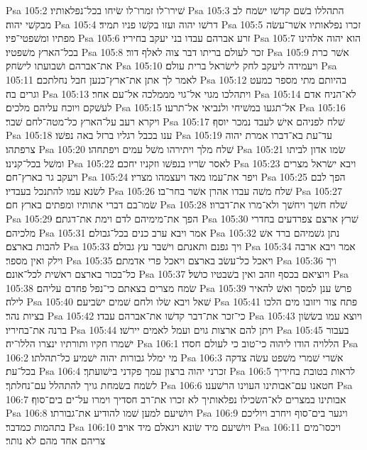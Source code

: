 Psa 105:2  שׁירו־לו זמרו־לו שׂיחו בכל־נפלאותיו׃
Psa 105:3  התהללו בשׁם קדשׁו ישׂמח לב מבקשׁי יהוה׃
Psa 105:4  דרשׁו יהוה ועזו בקשׁו פניו תמיד׃
Psa 105:5  זכרו נפלאותיו אשׁר־עשׂה מפתיו ומשׁפטי־פיו׃
Psa 105:6  זרע אברהם עבדו בני יעקב בחיריו׃
Psa 105:7  הוא יהוה אלהינו בכל־הארץ משׁפטיו׃
Psa 105:8  זכר לעולם בריתו דבר צוה לאלף דור׃
Psa 105:9  אשׁר כרת את־אברהם ושׁבועתו לישׂחק׃
Psa 105:10  ויעמידה ליעקב לחק לישׂראל ברית עולם׃
Psa 105:11  לאמר לך אתן את־ארץ־כנען חבל נחלתכם׃
Psa 105:12  בהיותם מתי מספר כמעט וגרים בה׃
Psa 105:13  ויתהלכו מגוי אל־גוי מממלכה אל־עם אחר׃
Psa 105:14  לא־הניח אדם לעשׁקם ויוכח עליהם מלכים׃
Psa 105:15  אל־תגעו במשׁיחי ולנביאי אל־תרעו׃
Psa 105:16  ויקרא רעב על־הארץ כל־מטה־לחם שׁבר׃
Psa 105:17  שׁלח לפניהם אישׁ לעבד נמכר יוסף׃
Psa 105:18  ענו בכבל רגליו ברזל באה נפשׁו׃
Psa 105:19  עד־עת בא־דברו אמרת יהוה צרפתהו׃
Psa 105:20  שׁלח מלך ויתירהו משׁל עמים ויפתחהו׃
Psa 105:21  שׂמו אדון לביתו ומשׁל בכל־קנינו׃
Psa 105:22  לאסר שׂריו בנפשׁו וזקניו יחכם׃
Psa 105:23  ויבא ישׂראל מצרים ויעקב גר בארץ־חם׃
Psa 105:24  ויפר את־עמו מאד ויעצמהו מצריו׃
Psa 105:25  הפך לבם לשׂנא עמו להתנכל בעבדיו׃
Psa 105:26  שׁלח משׁה עבדו אהרן אשׁר בחר־בו׃
Psa 105:27  שׂמו־בם דברי אתותיו ומפתים בארץ חם׃
Psa 105:28  שׁלח חשׁך ויחשׁך ולא־מרו את־דברוו׃
Psa 105:29  הפך את־מימיהם לדם וימת את־דגתם׃
Psa 105:30  שׁרץ ארצם צפרדעים בחדרי מלכיהם׃
Psa 105:31  אמר ויבא ערב כנים בכל־גבולם׃
Psa 105:32  נתן גשׁמיהם ברד אשׁ להבות בארצם׃
Psa 105:33  ויך גפנם ותאנתם וישׁבר עץ גבולם׃
Psa 105:34  אמר ויבא ארבה וילק ואין מספר׃
Psa 105:35  ויאכל כל־עשׂב בארצם ויאכל פרי אדמתם׃
Psa 105:36  ויך כל־בכור בארצם ראשׁית לכל־אונם׃
Psa 105:37  ויוציאם בכסף וזהב ואין בשׁבטיו כושׁל׃
Psa 105:38  שׂמח מצרים בצאתם כי־נפל פחדם עליהם׃
Psa 105:39  פרשׂ ענן למסך ואשׁ להאיר לילה׃
Psa 105:40  שׁאל ויבא שׂלו ולחם שׁמים ישׂביעם׃
Psa 105:41  פתח צור ויזובו מים הלכו בציות נהר׃
Psa 105:42  כי־זכר את־דבר קדשׁו את־אברהם עבדו׃
Psa 105:43  ויוצא עמו בשׂשׂון ברנה את־בחיריו׃
Psa 105:44  ויתן להם ארצות גוים ועמל לאמים יירשׁו׃
Psa 105:45  בעבור ישׁמרו חקיו ותורתיו ינצרו הללו־יה׃
Psa 106:1  הללויה הודו ליהוה כי־טוב כי לעולם חסדו׃
Psa 106:2  מי ימלל גבורות יהוה ישׁמיע כל־תהלתו׃
Psa 106:3  אשׁרי שׁמרי משׁפט עשׂה צדקה בכל־עת׃
Psa 106:4  זכרני יהוה ברצון עמך פקדני בישׁועתך׃
Psa 106:5  לראות בטובת בחיריך לשׂמח בשׂמחת גויך להתהלל עם־נחלתך׃
Psa 106:6  חטאנו עם־אבותינו העוינו הרשׁענו׃
Psa 106:7  אבותינו במצרים לא־השׂכילו נפלאותיך לא זכרו את־רב חסדיך וימרו על־ים בים־סוף׃
Psa 106:8  ויושׁיעם למען שׁמו להודיע את־גבורתו׃
Psa 106:9  ויגער בים־סוף ויחרב ויוליכם בתהמות כמדבר׃
Psa 106:10  ויושׁיעם מיד שׂונא ויגאלם מיד אויב׃
Psa 106:11  ויכסו־מים צריהם אחד מהם לא נותר׃
